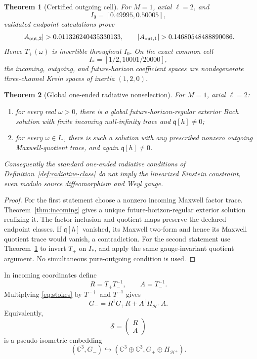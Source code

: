 \documentclass[11pt]{article}
\newtheorem{theorem}{Theorem}[section]
\theoremstyle{definition}
\theoremstyle{remark}
\newcommand{\C}{\mathbb C}
\begin{document}
\begin{theorem}[Certified outgoing cell]
\label{thm:outgoing-cell}
For \(M=1\), axial \(\ell=2\), and
\[
I_0=[0.49995,0.50005],
\]
validated endpoint calculations prove
\[
|A_{{\rm out},2}|>0.011326240435330133,
\qquad
|A_{{\rm out},1}|>0.14680548488890086.
\]
Hence \(T_+(\omega)\) is invertible throughout \(I_0\).  On the exact common
cell
\[
I_*=[1/2,10001/20000],
\]
the incoming, outgoing, and future-horizon coefficient spaces are
nondegenerate three-channel Krein spaces of inertia \((1,2,0)\).
\end{theorem}

\begin{theorem}[Global one-ended radiative nonselection]
\label{thm:radiative-nonselection}
For \(M=1\), axial \(\ell=2\):
\begin{enumerate}
\item for every real \(\omega>0\), there is a global
future-horizon-regular exterior Bach solution with finite incoming
null-infinity trace and \(\mathfrak q[h]\ne0\);
\item for every \(\omega\in I_*\), there is such a solution with any
prescribed nonzero outgoing Maxwell-quotient trace, and again
\(\mathfrak q[h]\ne0\).
\end{enumerate}
Consequently the standard one-ended radiative conditions of
Definition~\ref{def:radiative-class} do not imply the linearized Einstein
constraint, even modulo
source diffeomorphism and Weyl gauge.
\end{theorem}

\begin{proof}
For the first statement choose a nonzero incoming Maxwell factor trace.
Theorem~\ref{thm:incoming} gives a unique future-horizon-regular exterior
solution realizing it.  The factor inclusion and quotient maps preserve the
declared endpoint classes.  If \(\mathfrak q[h]\) vanished, its Maxwell
two-form and hence its Maxwell quotient trace would vanish, a contradiction.
For the second statement use Theorem~\ref{thm:outgoing-cell} to invert
\(T_+\) on \(I_*\), and apply the same gauge-invariant quotient argument.
No simultaneous pure-outgoing condition is used.
\end{proof}

In incoming coordinates define
\[
R=T_+T_-^{-1},
\qquad
A=T_-^{-1}.
\]
Multiplying \eqref{eq:stokes} by \(T_-^{-\dagger}\) and \(T_-^{-1}\) gives
\begin{equation}
\label{eq:pseudo}
G_-
=R^\dagger G_+R+A^\dagger H_{\mathcal H^+}A.
\end{equation}
Equivalently,
\[
\mathscr S=
\begin{pmatrix}R\\A\end{pmatrix}
\]
is a pseudo-isometric embedding
\[
(\C^3,G_-)
\hookrightarrow
(\C^3\oplus\C^3,G_+\oplus H_{\mathcal H^+}).
\]
\end{document}
